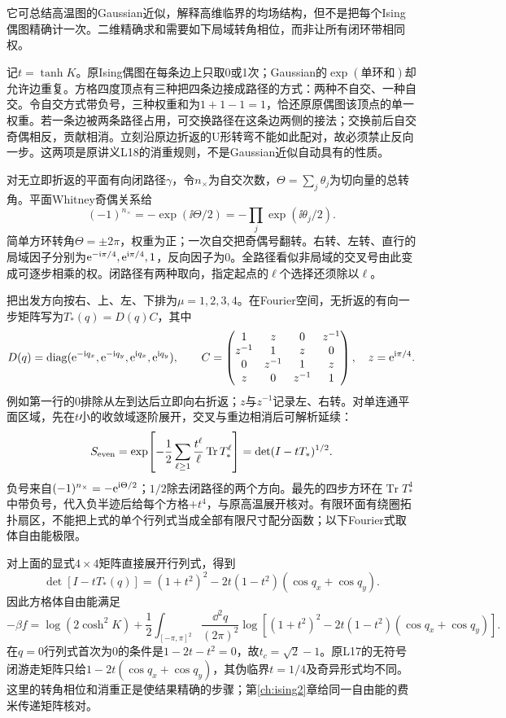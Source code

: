 它可总结高温图的Gaussian近似，解释高维临界的均场结构，但不是把每个Ising偶图精确计一次。二维精确求和需要如下局域转角相位，而非让所有闭环带相同权。

记$t=\tanh K$。原Ising偶图在每条边上只取0或1次；Gaussian的$\exp(\text{单环和})$却允许边重复。方格四度顶点有三种把四条边接成路径的方式：两种不自交、一种自交。令自交方式带负号，三种权重和为$1+1-1=1$，恰还原原偶图该顶点的单一权重。若一条边被两条路径占用，可交换路径在这条边两侧的接法；交换前后自交奇偶相反，贡献相消。立刻沿原边折返的U形转弯不能如此配对，故必须禁止反向一步。这两项是原讲义L18的消重规则，不是Gaussian近似自动具有的性质。

对无立即折返的平面有向闭路径$\gamma$，令$n_\times$为自交次数，$\Theta=\sum_j\theta_j$为切向量的总转角。平面Whitney奇偶关系给
\begin{equation}
(-1)^{n_\times}=-\exp(\ii\Theta/2)
=-\prod_j\exp(\ii\theta_j/2).
\end{equation}
简单方环转角$\Theta=\pm2\pi$，权重为正；一次自交把奇偶号翻转。右转、左转、直行的局域因子分别为$\mathrm e^{-\mathrm i\pi/4},\mathrm e^{\mathrm i\pi/4},1$，反向因子为0。全路径看似非局域的交叉号由此变成可逐步相乘的权。闭路径有两种取向，指定起点的$\ell$个选择还须除以$\ell$。

把出发方向按右、上、左、下排为$\mu=1,2,3,4$。在Fourier空间，无折返的有向一步矩阵写为$T_*(q)=D(q)C$，其中
\begin{equation}
D(q)=\operatorname{diag}(\mathrm e^{-\mathrm i q_x},\mathrm e^{-\mathrm i q_y},
\mathrm e^{\mathrm i q_x},\mathrm e^{\mathrm i q_y}),\qquad
C=\begin{pmatrix}
1&z&0&z^{-1}\\
z^{-1}&1&z&0\\
0&z^{-1}&1&z\\
z&0&z^{-1}&1
\end{pmatrix},\quad z=\mathrm e^{\mathrm i\pi/4}.
\end{equation}
例如第一行的0排除从左到达后立即向右折返；$z$与$z^{-1}$记录左、右转。对单连通平面区域，先在$t$小的收敛域逐阶展开，交叉与重边相消后可解析延续：
\begin{equation}
S_{\rm even}
=\exp\!\left[-\frac12\sum_{\ell\ge1}\frac{t^\ell}{\ell}
\operatorname{Tr}T_*^\ell\right]
=\det(I-tT_*)^{1/2}.
\end{equation}
负号来自$(-1)^{n_\times}=-\mathrm e^{\mathrm i\Theta/2}$；$1/2$除去闭路径的两个方向。最先的四步方环在$\operatorname{Tr}T_*^4$中带负号，代入负半迹后给每个方格$+t^4$，与原高温展开核对。有限环面有绕圈拓扑扇区，不能把上式的单个行列式当成全部有限尺寸配分函数；以下Fourier式取体自由能极限。

对上面的显式$4\times4$矩阵直接展开行列式，得到
\begin{equation}
\det[I-tT_*(q)]=(1+t^2)^2
-2t(1-t^2)(\cos q_x+\cos q_y).
\end{equation}
因此方格体自由能满足
\begin{equation}
-\beta f=\log(2\cosh^2K)+\frac12\int_{[-\pi,\pi]^2}
\frac{\dd^2q}{(2\pi)^2}
\log\!\left[(1+t^2)^2-2t(1-t^2)(\cos q_x+\cos q_y)\right].
\end{equation}
在$q=0$行列式首次为0的条件是$1-2t-t^2=0$，故$t_c=\sqrt2-1$。原L17的无符号闭游走矩阵只给$1-2t(\cos q_x+\cos q_y)$，其伪临界$t=1/4$及奇异形式均不同。这里的转角相位和消重正是使结果精确的步骤；第\ref{ch:ising2}章给同一自由能的费米传递矩阵核对。
